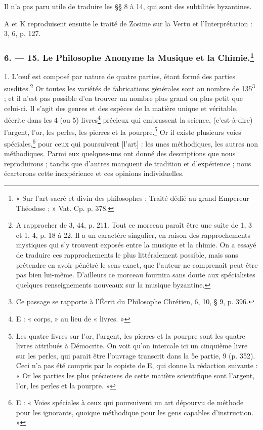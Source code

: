 \documentclass[a4paper, 11pt, oneside, polutonikogreek, french]{article}
\begin{document}
Il n'a pas paru utile de traduire les §§ 8 à 14, qui sont des subtilités byzantines.

A et K reproduisent ensuite le traité de Zosime sur la Vertu et l'Interprétation : 3, 6, p. 127.

\bigskip
\centerline{\EightStarTaper}
\centerline{\EightStarTaper\EightStarTaper}
\bigskip

\subsubsection[6. --- 15. Le Philosophe Anonyme la Musique et la Chimie.]{6. --- 15. Le Philosophe Anonyme la Musique et la Chimie.\footnote{« Sur l'art sacré et divin des philosophes : Traité dédié au grand Empereur Théodose ; » Vat. Cp. p. 378.}}

1. L'œuf est composé par nature de quatre parties, étant formé des parties susdites.\footnote{A rapprocher de 3, 44, p. 211. Tout ce morceau paraît être une suite de 1, 3 et 1, 4, p. 18 à 22. Il a un caractère singulier, en raison des rapprochements mystiques qui s'y trouvent exposés entre la musique et la chimie. On a essayé de traduire ces rapprochements le plus littéralement possible, mais sans prétendre en avoir pénétré le sens exact, que l'auteur ne comprenait peut-être pas bien lui-même. D'ailleurs ce morceau fournira sans doute aux spécialistes quelques renseignements nouveaux sur la musique byzantine.} Or toutes les variétés de fabrications générales sont au nombre de 135\footnote{Ce passage se rapporte à l'Écrit du Philosophe Chrétien, 6, 10, § 9, p. 396.} ; et il n'est pas possible d'en trouver un nombre plus grand ou plus petit que celui-ci. Il s'agit des genres et des espèces de la matière unique et véritable, décrite dans les 4 (ou 5) livres\footnote{E : « corps, » au lieu de « livres. »} précieux qui embrassent la science, (c'est-à-dire) l'argent, l'or, les perles, les pierres et la pourpre.\footnote{Les quatre livres sur l'or, l'argent, les pierres et la pourpre sont les quatre livres attribués à Démocrite. On voit qu'on intercale ici un cinquième livre sur les perles, qui parait être l'ouvrage transcrit dans la 5e partie, 9 (p. 352). Ceci n'a pas été compris par le copiste de E, qui donne la rédaction suivante : « Or les parties les plus précieuses de cette matière scientifique sont l'argent, l'or, les perles et la pourpre. »} Or il existe plusieurs voies spéciales,\footnote{E : « Voies spéciales à ceux qui poursuivent un art dépourvu de méthode pour les ignorants, quoique méthodique pour les gens capables d'instruction. »} pour ceux qui poursuivent [l'art] : les unes méthodiques, les autres non méthodiques. Parmi eux quelques-uns ont donné des descriptions que nous reproduirons ; tandis que d'autres manquent de tradition et d'expérience ; nous écarterons cette inexpérience et ces opinions individuelles.
\end{document}
